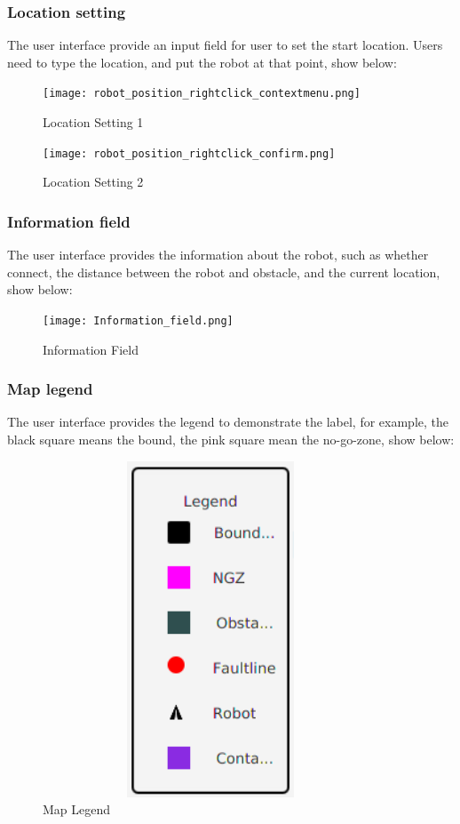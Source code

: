 \documentclass[12pt]{article}
\begin{document}
\clearpage



\subsubsection{Location setting}
The user interface provide an input field for user to set the start location. Users need to type the location, and put the robot at that point, show below:
\begin{figure}[H]
\centering
\texttt{[image: robot\_position\_rightclick\_contextmenu.png]}
\caption{Location Setting 1 }
  \label{fig:Location_setting1}
 \end{figure} 
  \begin{figure}[H] 
\centering
\texttt{[image: robot\_position\_rightclick\_confirm.png]}
\caption{Location Setting 2 }
  \label{fig:Location_setting2}
\end{figure}
\clearpage
\subsubsection{Information field}
The user interface provides the information about the robot, such as whether connect, the distance between the robot and obstacle, and the current location, show below:
\begin{figure}[H]
\texttt{[image: Information\_field.png]}
\caption{Information Field}
  \label{fig:Information_field}
\end{figure}


\subsubsection{Map legend}
The user interface provides the legend to demonstrate the label, for example, the black square means the bound, the pink square mean the no-go-zone, show below:
\begin{figure}[H]
\centering 
\includegraphics[width=10cm,height=10cm,keepaspectratio]{Legend.png}
\caption{Map Legend}
  \label{fig:Legend}
\end{figure}
\end{document}
